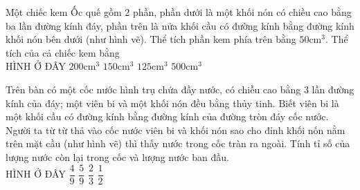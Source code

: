 \begin{ex}
	Một chiếc kem Ốc quế gồm $2$ phần, phần dưới là một khối nón có chiều cao bằng ba lần đường kính đáy, phần trên là nửa khối cầu có đường kính bằng đường kính khối nón bên dưới (như hình vẽ). Thể tích phần kem phía trên bằng $50\mathrm{cm}^3$. Thể tích của cả chiếc kem bằng\\
	{\color{red}HÌNH Ở ĐÂY}
	\choice
	{\True $200\mathrm{cm}^3$}
	{$150\mathrm{cm}^3$}
	{$125\mathrm{cm}^3$}
	{$500\mathrm{cm}^3$}
\end{ex}
\begin{ex}
	Trên bàn có một cốc nước hình trụ chứa đầy nước, có chiều cao bằng 3 lần đường kính của đáy; một viên bi và một khối nón đều bằng thủy tinh. Biết viên bi là một khối cầu có đường kính bằng đường kính của đường tròn đáy cốc nước. Người ta từ từ thả vào cốc nước viên bi và khối nón sao cho đỉnh khối nốn nằm trên mặt cầu (như hình vẽ) thì thấy nước trong cốc tràn ra ngoài. Tính tỉ số của lượng nước còn lại trong cốc và lượng nước ban đầu.\\
	{\color{red}HÌNH Ở ĐÂY}
	\choice
	{$\dfrac{4}{9}$}
	{\True $\dfrac{5}{9}$}
	{$\dfrac{2}{3}$}
	{$\dfrac{1}{2}$}
\end{ex}
